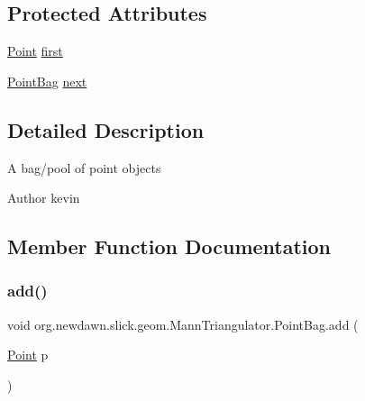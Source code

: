 \subsection*{Protected Attributes}
\begin{DoxyCompactItemize}
\item 
\mbox{\hyperlink{classorg_1_1newdawn_1_1slick_1_1geom_1_1_mann_triangulator_1_1_point}{Point}} \mbox{\hyperlink{classorg_1_1newdawn_1_1slick_1_1geom_1_1_mann_triangulator_1_1_point_bag_a120e5163711d94563be103af953fe059}{first}}
\item 
\mbox{\hyperlink{classorg_1_1newdawn_1_1slick_1_1geom_1_1_mann_triangulator_1_1_point_bag}{Point\+Bag}} \mbox{\hyperlink{classorg_1_1newdawn_1_1slick_1_1geom_1_1_mann_triangulator_1_1_point_bag_aa38075c8f56143bcdd9f754bfea38018}{next}}
\end{DoxyCompactItemize}


\subsection{Detailed Description}
A bag/pool of point objects

\begin{DoxyAuthor}{Author}
kevin 
\end{DoxyAuthor}


\subsection{Member Function Documentation}
\mbox{\label{classorg_1_1newdawn_1_1slick_1_1geom_1_1_mann_triangulator_1_1_point_bag_a7af185327fa10df11a02cf2f1fe6dcd4}} 
\subsubsection{\texorpdfstring{add()}{add()}}
{\footnotesize\ttfamily void org.\+newdawn.\+slick.\+geom.\+Mann\+Triangulator.\+Point\+Bag.\+add (\begin{DoxyParamCaption}\item[{\mbox{\hyperlink{classorg_1_1newdawn_1_1slick_1_1geom_1_1_mann_triangulator_1_1_point}{Point}}}]{p }\end{DoxyParamCaption})\hspace{0.3cm}{\ttfamily [inline]}}

